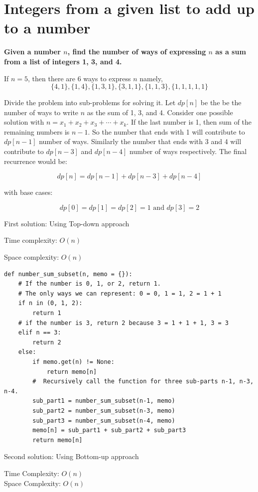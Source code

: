 \documentclass[a4paper,11pt]{book}
\begin{document}
\section{Integers from a given list to add up to a number}

\noindent \textbf{Given a number $n$, find the number of ways of expressing $n$ as a sum from a list of integers 1, 3, and 4.}
\vspace{5mm}

\noindent If $n = 5$, then there are 6 ways to express $n$ namely, $$\{4,1\}, \{1,4\}, \{1,3,1\}, \{3,1,1\}, \{1,1,3\}, \{1,1,1,1,1\}$$

\noindent Divide the problem into sub-problems for solving it. Let $dp[n]$ be the be the number of ways to write $n$ as the sum of 1, 3, and 4. Consider one possible solution with $n = x_1 + x_2 + x_3 + \cdots + x_k$. If the last number is 1, then sum of the remaining numbers is $n-1$. So the number that ends with 1 will contribute to $dp[n-1]$ number of ways. Similarly the number that ends with 3 and 4 will contribute to $dp[n-3]$ and $dp[n-4]$ number of ways respectively. The final recurrence would be: 

$$dp[n] = dp[n-1] + dp[n-3] + dp[n-4]$$

\noindent with base cases:

$$dp[0] = dp[1] = dp[2] = 1 \text{ and } dp[3] = 2$$

\noindent First solution: Using Top-down approach

\noindent Time complexity:  $O(n)$

\noindent Space complexity: $O(n)$
\begin{lstlisting}
def number_sum_subset(n, memo = {}):
    # If the number is 0, 1, or 2, return 1.
    # The only ways we can represent: 0 = 0, 1 = 1, 2 = 1 + 1
    if n in (0, 1, 2):
        return 1
    # if the number is 3, return 2 because 3 = 1 + 1 + 1, 3 = 3
    elif n == 3:
        return 2
    else:
        if memo.get(n) != None:
            return memo[n]
        #  Recursively call the function for three sub-parts n-1, n-3, n-4.
        sub_part1 = number_sum_subset(n-1, memo)
        sub_part2 = number_sum_subset(n-3, memo)
        sub_part3 = number_sum_subset(n-4, memo)
        memo[n] = sub_part1 + sub_part2 + sub_part3
        return memo[n]
\end{lstlisting}

\noindent Second solution: Using Bottom-up approach

\noindent Time Complexity: $O(n)$\\
\noindent Space Complexity: $O(n)$
\end{document}
